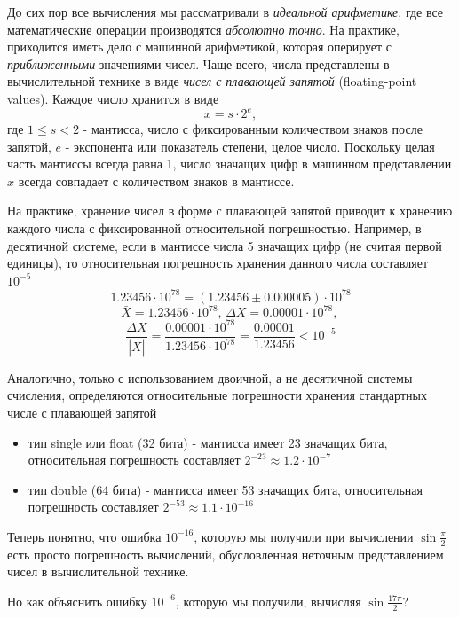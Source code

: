 \documentclass[professionalfonts,compress,unicode]{beamer}
\begin{document}
{
	До сих пор все вычисления мы рассматривали в \emph{идеальной арифметике}, где все математические 
	операции производятся \emph{абсолютно точно}. На практике, приходится иметь дело с машинной арифметикой,
	которая оперирует с \emph{приближенными} значениями чисел. Чаще всего, числа представлены в 
	вычислительной технике в виде \emph{чисел с плавающей запятой} (floating-point values). Каждое число хранится 
	в виде
	$$
	x = s \cdot 2^e,
	$$
	где $1 \leq s < 2$ - мантисса, число с фиксированным количеством знаков после запятой, $e$ - экспонента или показатель степени, 
	целое число. Поскольку целая часть мантиссы всегда равна 1, число значащих цифр в машинном представлении $x$ всегда совпадает с
	количеством знаков в мантиссе.
}

{
	На практике, хранение чисел в форме с плавающей запятой приводит к хранению каждого числа с фиксированной относительной погрешностью.
	Например, в десятичной системе, если в мантиссе числа 5 значащих цифр (не считая первой единицы), 
	то относительная погрешность хранения данного числа составляет $10^{-5}$
	$$
	1.23456 \cdot 10^{78} = (1.23456 \pm 0.000005) \cdot 10^{78}
	$$
	$$
	\bar X = 1.23456 \cdot 10^{78}, \, 
	\Delta X = 0.00001 \cdot 10^{78}, \,
	$$
	$$
	\frac{\Delta X}{|\bar X|} = \frac{0.00001\cdot 10^{78}}{1.23456\cdot 10^{78}} = \frac{0.00001}{1.23456} < 10^{-5}
	$$
}

{
	Аналогично, только с использованием двоичной, а не десятичной системы счисления, определяются
	относительные погрешности хранения стандартных числе с плавающей запятой
	\begin{itemize}
		\item тип single или float (32 бита) - мантисса имеет 23 значащих бита, 
		относительная погрешность составляет $2^{-23} \approx 1.2 \cdot 10^{-7}$
		\item тип double (64 бита) - мантисса имеет 53 значащих бита, 
		относительная погрешность составляет $2^{-53} \approx 1.1 \cdot 10^{-16}$
	\end{itemize}
	
	\pause
	Теперь понятно, что ошибка $10^{-16}$, которую мы получили при вычислении $\sin \frac{\pi}{2}$ есть 
	просто погрешность вычислений, обусловленная неточным представлением чисел в вычислительной технике.
	
	\pause
	Но как объяснить ошибку $10^{-6}$, которую мы получили, вычисляя $\sin \frac{17\pi}{2}$?
}
\end{document}

